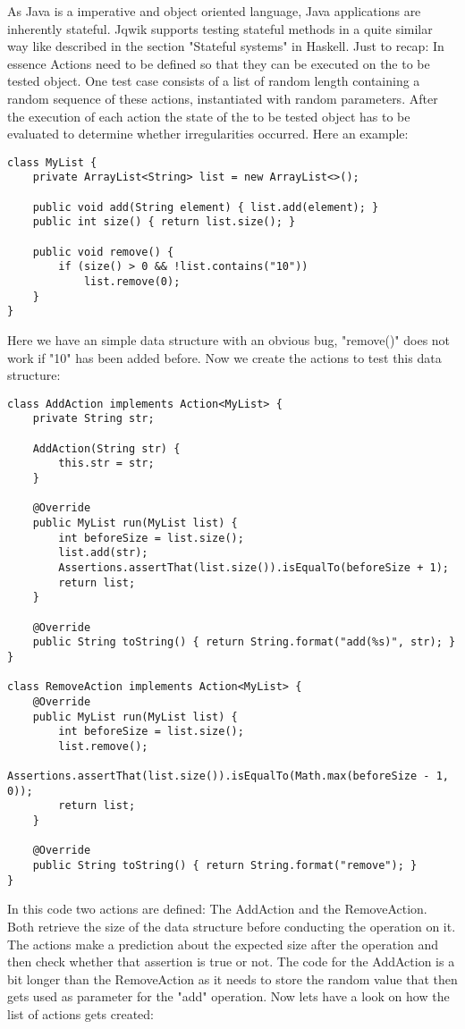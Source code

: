\documentclass[a4paper, 12pt]{article} %
\begin{document}
As Java is a imperative and object oriented language, Java applications are inherently stateful. Jqwik supports testing stateful methods in a quite similar way like described in the section "Stateful systems" in Haskell. Just to recap: In essence Actions need to be defined so that they can be executed on the to be tested object. One test case consists of a list of random length containing a random sequence of these actions, instantiated with random parameters. After the execution of each action the state of the to be tested object has to be evaluated to determine whether irregularities occurred. Here an example:

\begin{verbatim}
class MyList {
    private ArrayList<String> list = new ArrayList<>();

    public void add(String element) { list.add(element); }
    public int size() { return list.size(); }

    public void remove() {
        if (size() > 0 && !list.contains("10"))
            list.remove(0);
    }
}
\end{verbatim} 

Here we have an simple data structure with an obvious bug, "remove()" does not work if "10" has been added before. Now we create the actions to test this data structure:

\begin{verbatim}
class AddAction implements Action<MyList> {
    private String str;

    AddAction(String str) {
        this.str = str;
    }

    @Override
    public MyList run(MyList list) {
        int beforeSize = list.size();
        list.add(str);
        Assertions.assertThat(list.size()).isEqualTo(beforeSize + 1);
        return list;
    }

    @Override
    public String toString() { return String.format("add(%s)", str); }
}

class RemoveAction implements Action<MyList> {
    @Override
    public MyList run(MyList list) {
        int beforeSize = list.size();
        list.remove();
        Assertions.assertThat(list.size()).isEqualTo(Math.max(beforeSize - 1, 0));
        return list;
    }

    @Override
    public String toString() { return String.format("remove"); }
}
\end{verbatim} 

In this code two actions are defined: The AddAction and the RemoveAction. Both retrieve the size of the data structure before conducting the operation on it. The actions make a prediction about the expected size after the operation and then check whether that assertion is true or not. The code for the AddAction is a bit longer than the RemoveAction as it needs to store the random value that then gets used as parameter for the "add" operation. Now lets have a look on how the list of actions gets created:
\end{document}
